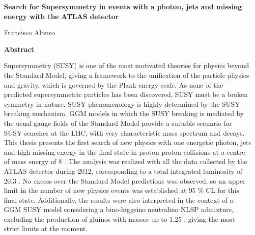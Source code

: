\thispagestyle{plain}
\begin{center}
  \Large
  \textbf{Search for Supersymmetry in events with a photon, jets and
    missing energy with the ATLAS detector}

  \vspace{0.4cm}
  \large

  \vspace{0.4cm}
  Francisco Alonso

  \vspace{2cm}
  \textbf{Abstract}
\end{center}

Supersymmetry (SUSY) is one of the most motivated theories for physics beyond
the Standard Model, giving a framework to the unification of the particle
physics and gravity, which is governed by the Plank energy scale. As none of
the predicted supersymmetric particles has been discovered, SUSY must be a
broken symmetry in nature. SUSY phenomenology is highly determined by the SUSY
breaking mechanism. GGM models in which the SUSY breaking is mediated by the
usual gauge fields of the Standard Model provide a suitable scenario for SUSY
searches at the LHC, with very characteristic mass spectrum and decays. This
thesis presents the first search of new physics with one energetic photon, jets
and high missing energy in the final state in proton-proton collisions at a
centre-of mass energy of 8 {\tev}. The analysis was realized with all the data
collected by the ATLAS detector during 2012, corresponding to a total
integrated luminosity of 20.3 \ifb. No excess over the Standard Model
predictions was observed, so an upper limit in the number of new physics events
was established at 95 \% CL for this final state. Additionally, the results were
also interpreted in the context of a GGM SUSY model considering a bino-higgsino
neutralino NLSP admixture, excluding the production of gluinos with masses up to
1.25 \tev, giving the most strict limits at the moment.

